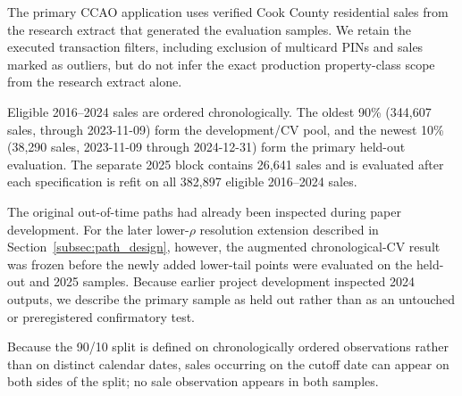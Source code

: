\documentclass[10pt]{article}
\theoremstyle{definition}
\newcommand{\1}{\mathbf{1}}
\begin{document}
The primary CCAO application uses verified Cook County residential sales from the research extract that generated the evaluation samples. We retain the executed transaction filters, including exclusion of multicard PINs and sales marked as outliers, but do not infer the exact production property-class scope from the research extract alone.


Eligible 2016--2024 sales are ordered chronologically. The oldest 90\% (344,607 sales, through 2023-11-09) form the development/CV pool, and the newest 10\% (38,290 sales, 2023-11-09 through 2024-12-31) form the primary held-out evaluation. The separate 2025 block contains 26,641 sales and is evaluated after each specification is refit on all 382,897 eligible 2016--2024 sales.

The original out-of-time paths had already been inspected during paper development. For the later lower-$\rho$ resolution extension described in Section~\ref{subsec:path_design}, however, the augmented chronological-CV result was frozen before the newly added lower-tail points were evaluated on the held-out and 2025 samples.
Because earlier project development inspected 2024 outputs, we describe the primary sample as held out rather than as an untouched or preregistered confirmatory test.

Because the 90/10 split is defined on chronologically ordered observations rather than on distinct calendar dates, sales occurring on the cutoff date can appear on both sides of the split; no sale observation appears in both samples.
\end{document}
